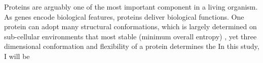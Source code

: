 Proteins are arguably one of the most important component in a living organism. As genes encode biological features, proteins deliver biological functions. One protein can adopt many structural conformations, which is largely determined on sub-cellular environments that most stable (minimum overall entropy) , yet three dimensional conformation and flexibility of a protein determines the     In this study, I will be 